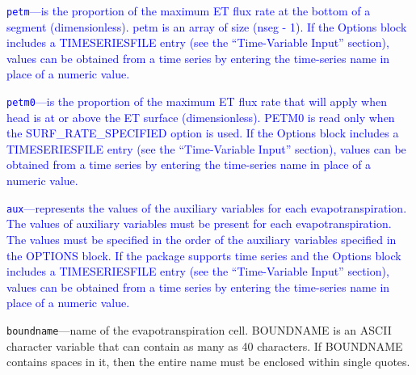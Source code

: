 \begin{description}
\item \textcolor{blue}{\texttt{petm}---is the proportion of the maximum ET flux rate at the bottom of a segment (dimensionless). petm is an array of size (nseg - 1).  If the Options block includes a TIMESERIESFILE entry (see the ``Time-Variable Input'' section), values can be obtained from a time series by entering the time-series name in place of a numeric value.}

\item \textcolor{blue}{\texttt{petm0}---is the proportion of the maximum ET flux rate that will apply when head is at or above the ET surface (dimensionless). PETM0 is read only when the SURF\_RATE\_SPECIFIED option is used. If the Options block includes a TIMESERIESFILE entry (see the ``Time-Variable Input'' section), values can be obtained from a time series by entering the time-series name in place of a numeric value.}

\item \textcolor{blue}{\texttt{aux}---represents the values of the auxiliary variables for each evapotranspiration. The values of auxiliary variables must be present for each evapotranspiration. The values must be specified in the order of the auxiliary variables specified in the OPTIONS block.  If the package supports time series and the Options block includes a TIMESERIESFILE entry (see the ``Time-Variable Input'' section), values can be obtained from a time series by entering the time-series name in place of a numeric value.}

\item \texttt{boundname}---name of the evapotranspiration cell.  BOUNDNAME is an ASCII character variable that can contain as many as 40 characters.  If BOUNDNAME contains spaces in it, then the entire name must be enclosed within single quotes.

\end{description}

